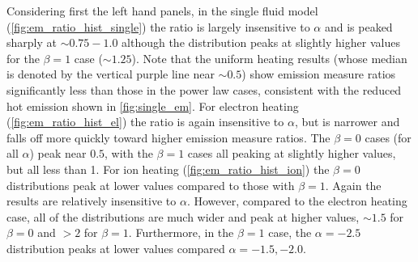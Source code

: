 \documentclass[preprint,linenumbers]{aastex}
\begin{document}
	\par Considering first the left hand panels, in the single fluid model (\autoref{fig:em_ratio_hist_single}) the ratio is largely insensitive to $\alpha$ and is peaked sharply at $\sim0.75-1.0$ although the distribution peaks at slightly higher values for the $\beta=1$ case ($\sim1.25$). Note that the uniform heating results (whose median is denoted by the vertical purple line near $\sim0.5$) show emission measure ratios significantly less than those in the power law cases, consistent with the reduced hot emission shown in \autoref{fig:single_em}. For electron heating (\autoref{fig:em_ratio_hist_el}) the ratio is again insensitive to $\alpha$, but is narrower and falls off more quickly toward higher emission measure ratios. The $\beta=0$ cases (for all $\alpha$) peak near $0.5$, with the $\beta=1$ cases all peaking at slightly higher values, but all less than 1. For ion heating (\autoref{fig:em_ratio_hist_ion}) the $\beta=0$ distributions peak at lower values compared to those with $\beta=1$. Again the results are relatively insensitive to $\alpha$. However, compared to the electron heating case, all of the distributions are much wider and peak at higher values, $\sim1.5$ for $\beta=0$ and $>2$ for $\beta=1$. Furthermore, in the $\beta=1$ case, the $\alpha=-2.5$ distribution peaks at lower values compared $\alpha=-1.5,-2.0$.
\end{document}

